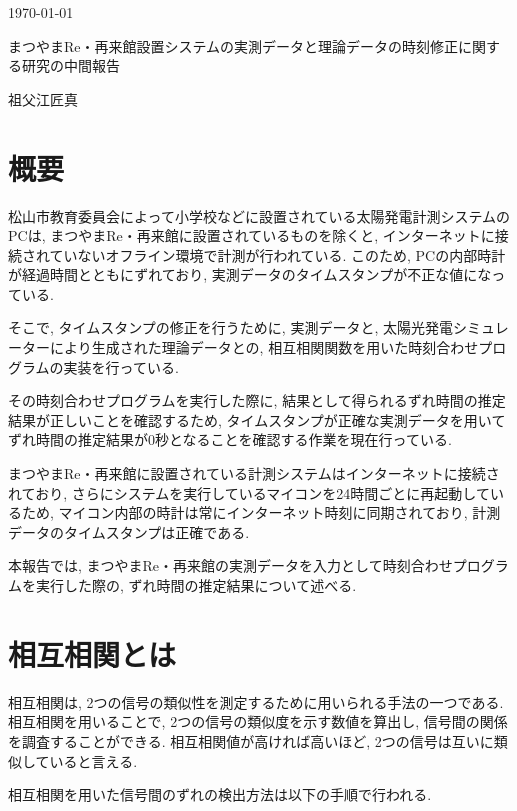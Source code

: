 \documentclass[a4j,12pt,]{jarticle}
\begin{document}
{\noindent\small  \hfill\today}
\begin{center}
  {\Large まつやまRe・再来館設置システムの実測データと理論データの時刻修正に関する研究の中間報告}
\end{center}
\begin{flushright}
  祖父江匠真 \\
\end{flushright}

\section{概要}
松山市教育委員会によって小学校などに設置されている太陽発電計測システムのPCは, まつやまRe・再来館に設置されているものを除くと, インターネットに接続されていないオフライン環境で計測が行われている. このため, PCの内部時計が経過時間とともにずれており, 実測データのタイムスタンプが不正な値になっている.

そこで, タイムスタンプの修正を行うために, 実測データと, 太陽光発電シミュレーターにより生成された理論データとの, 相互相関関数を用いた時刻合わせプログラムの実装を行っている.

その時刻合わせプログラムを実行した際に, 結果として得られるずれ時間の推定結果が正しいことを確認するため, タイムスタンプが正確な実測データを用いてずれ時間の推定結果が0秒となることを確認する作業を現在行っている.

まつやまRe・再来館に設置されている計測システムはインターネットに接続されており, さらにシステムを実行しているマイコンを24時間ごとに再起動しているため, マイコン内部の時計は常にインターネット時刻に同期されており, 計測データのタイムスタンプは正確である.

本報告では, まつやまRe・再来館の実測データを入力として時刻合わせプログラムを実行した際の, ずれ時間の推定結果について述べる.

\section{相互相関とは}
相互相関は, 2つの信号の類似性を測定するために用いられる手法の一つである. 相互相関を用いることで, 2つの信号の類似度を示す数値を算出し, 信号間の関係を調査することができる. 相互相関値が高ければ高いほど, 2つの信号は互いに類似していると言える.

相互相関を用いた信号間のずれの検出方法は以下の手順で行われる\cite{1}.
\end{document}
